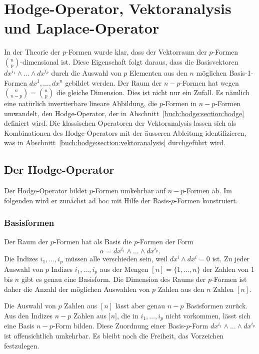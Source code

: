 %
%
%
\chapter{Hodge-Operator, Vektoranalysis und Laplace-Operator
\label{chapter:hodge}}
In der Theorie der $p$-Formen wurde klar, dass der Vektorraum der
$p$-Formen $\binom{n}{p}$-dimensional ist.
Diese Eigenschaft folgt daraus, dass die Basisvektoren
$dx^{i_1}\wedge\dots\wedge dx^{i_p}$ durch die Auswahl von $p$ Elementen
aus den $n$ möglichen Basis-1-Formen $dx^1,\dots,dx^n$ gebildet
werden.
Der Raum der $n-p$-Formen hat wegen $\binom{n}{n-p}=\binom{n}{p}$
die gleiche Dimension.
Dies ist nicht nur ein Zufall.
Es nämlich eine natürlich invertierbare lineare Abbildung, die $p$-Formen
in $n-p$-Formen umwandelt, den Hodge-Operator, der in
Abschnitt~\ref{buch:hodge:section:hodge} definiert wird.
Die klassischen Operatoren der Vektoranalysis lassen sich als
Kombinationen des Hodge-Operators mit der äusseren Ableitung identifizieren,
was in Abschnitt~\ref{buch:hodge:section:vektoranalysis} durchgeführt
wird.

%
%
\section{Der Hodge-Operator
\label{buch:hodge:section:hodge}}
Der Hodge-Operator bildet $p$-Formen umkehrbar auf $n-p$-Formen ab.
Im folgenden wird er zunächst ad hoc mit Hilfe der Basis-$p$-Formen
konstruiert.

\subsection{Basisformen}
Der Raum der $p$-Formen hat als Basis die $p$-Formen der Form
\[
\alpha = dx^{i_1}\wedge\dots\wedge dx^{i_p}.
\]
Die Indizes $i_1,\dots,i_p$ müssen alle verschieden sein, weil
$dx^i\wedge dx^i=0$ ist.
Zu jeder Auswahl von $p$ Indizes $i_1,\dots,i_p$ aus der Mengen
$[n]=\{1,\dots,n\}$ der Zahlen von 1 bis $n$ gibt es genau eine Basisform.
Die Dimension des Raums der $p$-Formen ist daher die Anzahl der möglichen
Auswahlen von $p$ Zahlen aus den $n$ Zahlen $[n]$.

Die Auswahl von $p$ Zahlen aus $[n]$ lässt aber genau $n-p$ Basisformen
zurück.
Aus den Indizes $n-p$ Zahlen aus $]n]$, die in $i_1,\dots,i_p$ nicht
vorkommen, lässt sich eine Basis $n-p$-Form bilden.
Diese Zuordnung einer Basis-$p$-Form $dx^{i_1}\wedge\dots\wedge dx^{i_p}$
ist offensichtlich umkehrbar.
Es bleibt noch die Freiheit, das Vorzeichen festzulegen.

